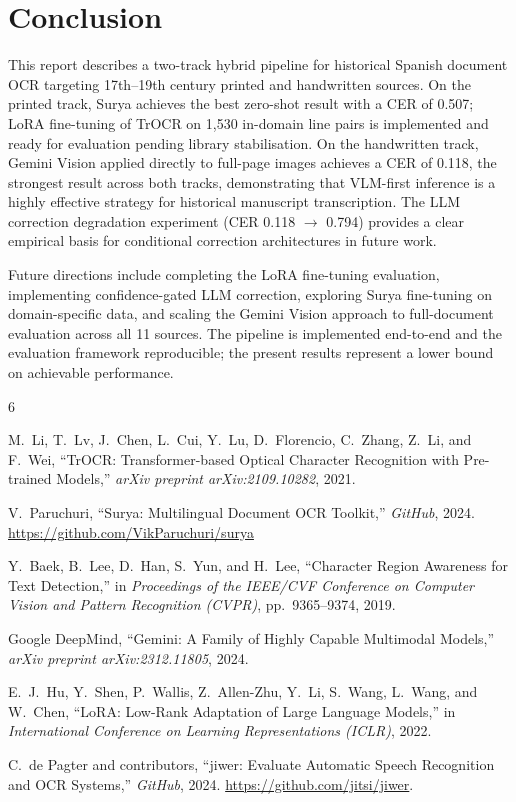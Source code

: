 \documentclass[11pt,a4paper]{article}
\begin{document}
\section{Conclusion}

This report describes a two-track hybrid pipeline for historical Spanish document OCR
targeting 17th--19th century printed and handwritten sources. On the printed track, Surya
achieves the best zero-shot result with a CER of 0.507; LoRA fine-tuning of TrOCR on
1,530 in-domain line pairs is implemented and ready for evaluation pending library
stabilisation. On the handwritten track, Gemini Vision applied directly to full-page
images achieves a CER of 0.118, the strongest result across both tracks, demonstrating
that VLM-first inference is a highly effective strategy for historical manuscript
transcription. The LLM correction degradation experiment (CER 0.118 $\to$ 0.794) provides
a clear empirical basis for conditional correction architectures in future work.

Future directions include completing the LoRA fine-tuning evaluation, implementing
confidence-gated LLM correction, exploring Surya fine-tuning on domain-specific data,
and scaling the Gemini Vision approach to full-document evaluation across all 11 sources.
The pipeline is implemented end-to-end and the evaluation framework reproducible; the
present results represent a lower bound on achievable performance.

\begin{thebibliography}{6}

M.\ Li, T.\ Lv, J.\ Chen, L.\ Cui, Y.\ Lu, D.\ Florencio, C.\ Zhang, Z.\ Li, and F.\ Wei,
``TrOCR: Transformer-based Optical Character Recognition with Pre-trained Models,''
\textit{arXiv preprint arXiv:2109.10282}, 2021.

V.\ Paruchuri,
``Surya: Multilingual Document OCR Toolkit,''
\textit{GitHub}, 2024.
\url{https://github.com/VikParuchuri/surya}

Y.\ Baek, B.\ Lee, D.\ Han, S.\ Yun, and H.\ Lee,
``Character Region Awareness for Text Detection,''
in \textit{Proceedings of the IEEE/CVF Conference on Computer Vision and Pattern Recognition (CVPR)},
pp.\ 9365--9374, 2019.

Google DeepMind,
``Gemini: A Family of Highly Capable Multimodal Models,''
\textit{arXiv preprint arXiv:2312.11805}, 2024.

E.\ J.\ Hu, Y.\ Shen, P.\ Wallis, Z.\ Allen-Zhu, Y.\ Li, S.\ Wang, L.\ Wang, and W.\ Chen,
``LoRA: Low-Rank Adaptation of Large Language Models,''
in \textit{International Conference on Learning Representations (ICLR)}, 2022.

C.\ de Pagter and contributors,
``jiwer: Evaluate Automatic Speech Recognition and OCR Systems,''
\textit{GitHub}, 2024.
\url{https://github.com/jitsi/jiwer}.

\end{thebibliography}
\end{document}
